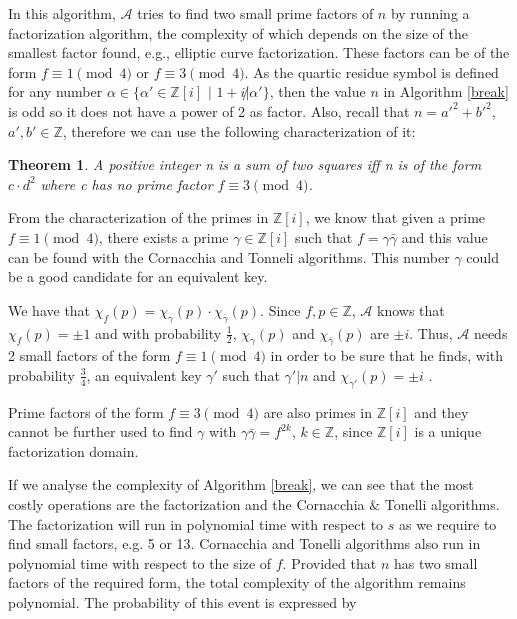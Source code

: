 \documentclass[11pt, a4paper, twoside, openright]{report}
\newtheorem{theorem}{Theorem}
\begin{document}
	    
	    
	    
	    
	     
		In this algorithm, $\mathcal{A}$ tries to find two small prime factors 
		of $n$ by running a factorization algorithm, the complexity of which depends on the size of the smallest factor
		found, e.g., elliptic curve factorization. These factors can be of the form $ f \equiv 1 \pmod{4} $ or
		$ f \equiv 3 \pmod{4} $. As the quartic residue symbol is defined for any number
		$\alpha \in \{ \alpha' \in \mathbb{Z}[i]$ $ | $ $ 1+i \not | \alpha' \} $, 
		then the value $n$ in Algorithm \ref{break} is odd so it does not have a 
		power of 2 as factor. Also, recall that $n = a'^2 + b'^2$, $a', b' \in \mathbb{Z}$, therefore we can use the following characterization of it: 
		
		\begin{theorem}
		A positive integer n is a sum of two squares iff n is of the form $c \cdot d^2$ where c has no prime factor 
		$f \equiv 3 \pmod{4} $. 
		\end{theorem}
		
		From the characterization of the primes in $\mathbb{Z}[i]$, we know that given a prime $ f \equiv 1 \pmod{4} $, there exists a prime 
		$\gamma \in \mathbb{Z}[i] $ such that $f =\gamma \bar{\gamma}$ and this value can be found with
		 the Cornacchia and Tonneli algorithms. This number $\gamma$ could be a good candidate for an equivalent key. 
		
		We have that $\chi_f(p) = \chi_{\gamma}(p) \cdot \chi_{\bar{\gamma}}(p)$. Since $f,p \in \mathbb{Z}$, $\mathcal{A}$ knows that $\chi_f(p)= \pm 1$
		and with probability $\frac{1}{2}$, $\chi_{\gamma}(p)$ and $\chi_{\bar{\gamma}}(p)$ are $\pm i$. Thus, $\mathcal{A}$ needs 2 small 
		factors of the form $ f \equiv 1 \pmod{4} $ in order to be sure that he finds, with probability $\frac{3}{4}$, an equivalent key $\gamma'$ such that 
		$\gamma' | n$ and $\chi_{\gamma'}(p) = \pm i$ . 
		
		Prime factors of the form $ f \equiv 3 \pmod{4} $ are also primes in $\mathbb{Z}[i]$ and they cannot be further used to find 
		$\gamma$ with $\gamma \bar{\gamma} = f^{2k}$, $k \in \mathbb{Z}$, since $\mathbb{Z}[i]$ is a unique factorization domain. 
		
		
		If we analyse the complexity of Algorithm \ref{break}, we can see that the most costly operations are the 
		factorization and the Cornacchia $\&$ Tonelli algorithms. The factorization will run in polynomial time with respect to $s$ as we require to find small
		factors, e.g. 5 or 13. Cornacchia and Tonelli algorithms also run in polynomial time with respect to the size of $f$. 
	    Provided that $n$ has two small factors of the required form, the total complexity of the algorithm remains polynomial. The probability of this event is expressed by 
	    
\end{document}
